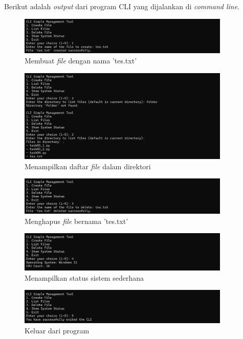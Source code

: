 \documentclass[12pt]{article}
\begin{document}
\noindent Berikut adalah \textit{output} dari program CLI yang dijalankan di \textit{command line}.
\begin{figure}[h]
    \centering
    \includegraphics[width=0.9\textwidth]{asset/a4-output-1.png}
    \caption{Membuat \textit{file} dengan nama 'tes.txt'}
    \label{fig:a4-output-1}
\end{figure}
\begin{figure}[h]
    \centering
    \includegraphics[width=0.9\textwidth]{asset/a4-output-2.png}
    \caption{Menampilkan daftar \textit{file} dalam direktori}
    \label{fig:a4-output-2}
\end{figure}
\begin{figure}[h]
    \centering
    \includegraphics[width=0.9\textwidth]{asset/a4-output-3.png}
    \caption{Menghapus \textit{file} bernama 'tes.txt'}
    \label{fig:a4-output-3}
\end{figure}
\begin{figure}[h]
    \centering
    \includegraphics[width=0.9\textwidth]{asset/a4-output-4.png}
    \caption{Menampilkan status sistem sederhana}
    \label{fig:a4-output-4}
\end{figure}
\begin{figure}[h]
    \centering
    \includegraphics[width=0.9\textwidth]{asset/a4-output-5.png}
    \caption{Keluar dari program}
    \label{fig:a4-output-5}
\end{figure}
\end{document}
